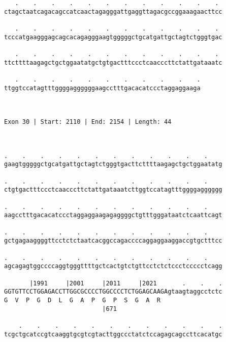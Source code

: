 \documentclass{article}
\begin{document}
\begin{Verbatim}
   .    .    .    .    .    .    .    .    .    .    .    . 
ctagctaatcagacagccatcaactagagggattgaggttagacgccggaaagaacttcc
                                                            
   .    .    .    .    .    .    .    .    .    .    .    . 
tcccatgaagggagcagcacagagggaagtgggggctgcatgattgctagtctgggtgac
                                                            
   .    .    .    .    .    .    .    .    .    .    .    . 
ttcttttaagagctgctggaatatgctgtgactttccctcaacccttctattgataaatc
                                                            
   .    .    .    .    .    .    .    .    .    .    .
ttggtccatagtttggggaggggggaagcctttgacacatccctaggaggaaga
                                                      
                                                      
 
Exon 30 | Start: 2110 | End: 2154 | Length: 44



.    .    .    .    .    .    .    .    .    .    .    .    
gaagtgggggctgcatgattgctagtctgggtgacttcttttaagagctgctggaatatg
                                                            
.    .    .    .    .    .    .    .    .    .    .    .    
ctgtgactttccctcaacccttctattgataaatcttggtccatagtttggggagggggg
                                                            
.    .    .    .    .    .    .    .    .    .    .    .    
aagcctttgacacatccctaggaggaagagaggggctgtttgggataatctcaattcagt
                                                            
.    .    .    .    .    .    .    .    .    .    .    .    
gctgagaaggggttcctctctaatcacggccagaccccaggaggaaggaccgtgctttcc
                                                            
.    .    .    .    .    .    .    .    .    .    .    .    
agcagagtggccccaggtgggttttgctcactgtctgttcctctctccctccccctcagg
                                                            
       |1991     |2001     |2011     |2021       .    .    .
GGTGTTCCTGGAGACCTTGGCGCCCCTGGCCCCTCTGGAGCAAGAgtaagtaggcctctc
G  V  P  G  D  L  G  A  P  G  P  S  G  A  R                 
                           |671                             
  
    .    .    .    .    .    .    .    .    .    .    .    .
tcgctgcatccgtcaaggtgcgtcgtacttggccctatctccagagcagccttcacatgc
                                                            

\end{Verbatim}
\end{document}
